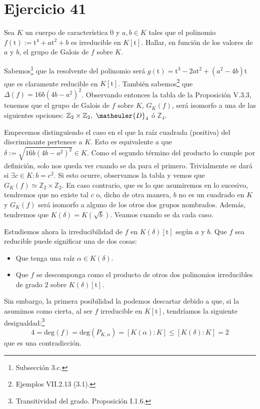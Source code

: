 \section{Ejercicio 41}
\begin{enun}
    Sea $K$ un cuerpo de característica $0$ y $a, b \in K$ tales que el polinomio $f\left( \mathrm{t} \right) := \mathrm{t}^4 + a \mathrm{t}^2 + b$ es irreducible en $K\left[\mathrm{t}\right]$.
    Hallar, en función de los valores de $a$ y $b$, el grupo de Galois de $f$ sobre $K$.
\end{enun}

\begin{sol}
    Sabemos\footnote{Subsección 3.c\cite{cuerpos}.} que la resolvente del polinomio será $g\left( \mathrm{t} \right) = \mathrm{t}^3 - 2a \mathrm{t}^2 + \left( a^2 - 4b \right)\mathrm{t}$ que es claramente reducible en $K\left[\mathrm{t}\right]$. También sabemos\footnote{Ejemplos VII.2.13 (3.1)\cite{anillos}.} que $\Delta\left( f \right) = 16b\left( 4b - a^2 \right)^2$. Observando entonces la tabla de la Proposición V.3.3\cite{cuerpos}, tenemos que el grupo de Galois de $f$ sobre $K$, $G_K\left( f \right)$, será isomorfo a una de las siguientes opciones: $\mathbb{Z}_2 \times \mathbb{Z}_2,\ \matheuler{D}_4$ ó $\mathbb{Z}_4$.

    Empecemos distinguiendo el caso en el que la raíz cuadrada (positiva) del discriminante pertenece a $K$. Esto es equivalente a que $\delta := \sqrt{16b\left( 4b - a^2 \right)^2} \in K$. Como el segundo término del producto lo cumple por definición, solo nos queda ver cuando se da para el primero. Trivialmente se dará si $\exists c \in K : b = c^2$. Si esto ocurre, observamos la tabla y vemos que $\boxed{G_K\left( f \right) \simeq \mathbb{Z}_2 \times \mathbb{Z}_2}$. En caso contrario, que es lo que asumiremos en lo sucesivo, tendremos que no existe tal $c$ o, dicho de otra manera, $b$ no es un cuadrado en $K$ y $G_K\left( f \right)$ será isomorfo a alguno de los otros dos grupos nombrados. Además, tendremos que $K\left( \delta \right) = K\left( \sqrt{b} \right)$. Veamos cuando se da cada caso.

    Estudiemos ahora la irreducibilidad de $f$ en $K\left( \delta \right)\left[ \mathrm{t} \right]$ según $a$ y $b$. Que $f$ sea reducible puede significar una de dos cosas:
    \begin{itemize}
        \item Que tenga una raíz $\alpha \in K\left( \delta \right)$.
        \item Que $f$ se descomponga como el producto de otros dos polinomios irreducibles de grado $2$ sobre $K\left( \delta \right)\left[ \mathrm{t} \right]$.
    \end{itemize}
    Sin embargo, la primera posibilidad la podemos descartar debido a que, si la asumimos como cierta, al ser $f$ irreducible en $K\left[ \mathrm{t} \right]$, tendríamos la siguiente desigualdad:\footnote{Transitividad del grado. Proposición I.1.6\cite{cuerpos}.}
    \[
    4 = \mathrm{deg}\left( f \right) = \mathrm{deg}\left( P_{K, \alpha} \right) = \left[ K\left( \alpha \right) : K \right] \le \left[ K\left( \delta \right) : K \right] = 2
    \]
    que es una contradicción.


\end{sol}
